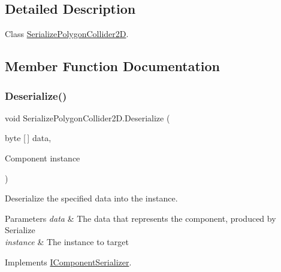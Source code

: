 \subsection{Detailed Description}
Class \hyperlink{class_serialize_polygon_collider2_d}{Serialize\+Polygon\+Collider2D}. 



\subsection{Member Function Documentation}
\mbox{\label{class_serialize_polygon_collider2_d_a91694bef6812922cf021805d76b9d7e4}} 
\subsubsection{\texorpdfstring{Deserialize()}{Deserialize()}}
{\footnotesize\ttfamily void Serialize\+Polygon\+Collider2\+D.\+Deserialize (\begin{DoxyParamCaption}\item[{byte \mbox{[}$\,$\mbox{]}}]{data,  }\item[{Component}]{instance }\end{DoxyParamCaption})\hspace{0.3cm}{\ttfamily [inline]}}



Deserialize the specified data into the instance. 


\begin{DoxyParams}{Parameters}
{\em data} & The data that represents the component, produced by Serialize\\
\hline
{\em instance} & The instance to target\\
\hline
\end{DoxyParams}


Implements \hyperlink{interface_i_component_serializer_a4cc366a5c78b33d47a90c209d8fed883}{I\+Component\+Serializer}.

\mbox{\label{class_serialize_polygon_collider2_d_a0f488a1150cc7f8786e659577a4d9488}} 
